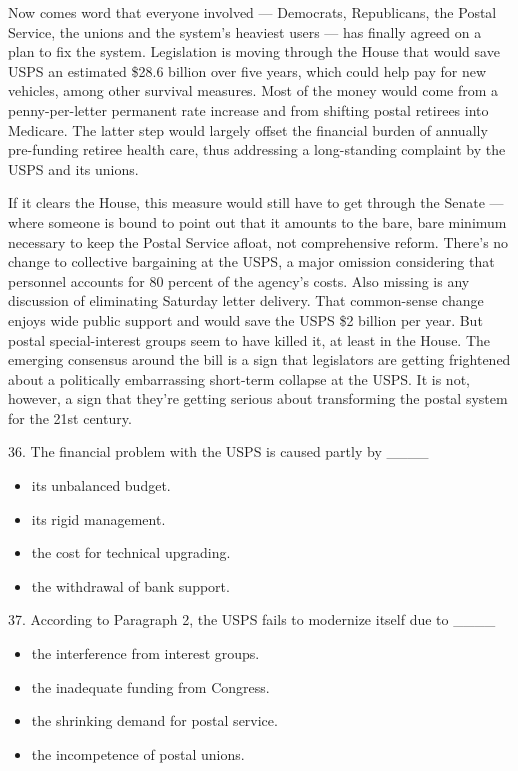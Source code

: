 \documentclass[UTF8,11pt]{ctexart}
\begin{document}
Now comes word that everyone involved — Democrats, Republicans, the Postal Service, the unions and the system’s heaviest users — has finally agreed on a plan to fix the system. Legislation is moving through the House that would save USPS an estimated \$28.6 billion over five years, which could help pay for new vehicles, among other survival measures. Most of the money would come from a penny-per-letter permanent rate increase and from shifting postal retirees into Medicare. The latter step would largely offset the financial burden of annually pre-funding retiree health care, thus addressing a long-standing complaint by the USPS and its unions.


If it clears the House, this measure would still have to get through the Senate — where someone is bound to point out that it amounts to the bare, bare minimum necessary to keep the Postal Service afloat, not comprehensive reform. There’s no change to collective bargaining at the USPS, a major omission considering that personnel accounts for 80 percent of the agency’s costs. Also missing is any discussion of eliminating Saturday letter delivery. That common-sense change enjoys wide public support and would save the USPS \$2 billion per year. But postal special-interest groups seem to have killed it, at least in the House. The emerging consensus around the bill is a sign that legislators are getting frightened about a politically embarrassing short-term collapse at the USPS. It is not, however, a sign that they’re getting serious about transforming the postal system for the 21st century.


36. The financial problem with the USPS is caused partly by \_\_\_\_


\begin{itemize}[leftmargin=2em,itemsep=.2em,topsep=.4em]\item[A.] its unbalanced budget.
\item[B.] its rigid management.
\item[C.] the cost for technical upgrading.
\item[D.] the withdrawal of bank support.
\end{itemize}

37. According to Paragraph 2, the USPS fails to modernize itself due to \_\_\_\_


\begin{itemize}[leftmargin=2em,itemsep=.2em,topsep=.4em]\item[A.] the interference from interest groups.
\item[B.] the inadequate funding from Congress.
\item[C.] the shrinking demand for postal service.
\item[D.] the incompetence of postal unions.
\end{itemize}
\end{document}
